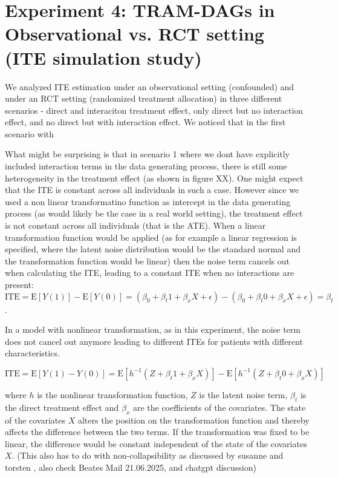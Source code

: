 \section{Experiment 4: TRAM-DAGs in Observational vs. RCT setting  (ITE simulation study)}

We analyzed ITE estimation under an observational setting (confounded) and under an RCT setting (randomized treatment allocation) in three different scenarios - direct and interaciton treatment effect, only direct but no interaction effect, and no direct but with interaction effect. We noticed that in the first scenario with 


What might be surprising is that in scenario 1 where we dont have explicitly included interaction terms in the data generating process, there is still some heterogeneity in the treatment effect (as shown in figure XX). One might expect that the ITE is constant across all individuals in such a case. However since we used a non linear transformatino function as intercept in the data generating process (as would likely be the case in a real world setting), the treatment effect is not constant across all individuals (that is the ATE). When a linear transformation function would be applied (as for example a linear regression is specified, where the latent noise distribution would be the standard normal and the transformation function would be linear) then the noise term cancels out when calculating the ITE, leading to a constant ITE when no interactions are present: $\text{ITE} = \text{E}[Y(1)] -\text{E}[Y(0)] = (\beta_0 + \beta_t 1 + \beta_x X + \epsilon) - (\beta_0 + \beta_t 0 + \beta_x X + \epsilon) = \beta_t$.

In a model with nonlinear transformation, as in this experiment, the noise term does not cancel out anymore leading to different ITEs for patients with different characteristics.

\begin{equation}
\text{ITE} = \text{E}[Y(1) - Y(0)] = \text{E}[h^{-1}(Z + \beta_t 1 + \beta_x X)] - \text{E}[h^{-1}(Z + \beta_t 0 + \beta_x X)] 
\end{equation}

where $h$ is the nonlinear transformation function, $Z$ is the latent noise term, $\beta_t$ is the direct treatment effect and $\beta_x$ are the coefficients of the covariates. The state of the covariates $X$ alters the position on the transformation function and thereby affects the difference between the two terms. If the transformation was fixed to be linear, the difference would be constant independent of the state of the covariates $X$. (This also has to do with non-collapsibility as discussed by susanne and torsten , also check Beates Mail 21.06.2025, and chatgpt discussion)

